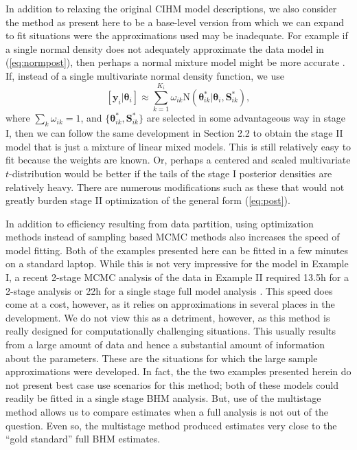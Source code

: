 \documentclass[12pt]{article}
\newcommand{\by}{\mathbf{y}}
\newcommand{\bt}{\boldsymbol{\theta}}
\newcommand{\bS}{\mathbf{S}}
\begin{document}
In addition to relaxing the original CIHM model descriptions, we also consider the method as present here to be a base-level version from which we can expand to fit situations were the approximations used may be inadequate. For example if a single normal density does not adequately approximate the data model in (\ref{eq:normpost}), then perhaps a normal mixture model might be more accurate \citep{gelman2013bayesian}. If, instead of a single multivariate normal density function, we use     
\[
[\by_i|\bt_i] \approx \sum_{k=1}^{K_i}\omega_{ik}\text{N}(\bt_{ik}^*|\bt_{i}, \bS_{ik}^*),
\]
where $\sum_k \omega_{ik} = 1$, and $\{\bt_{ik}^*, \bS_{ik}^*\}$ are selected in some advantageous way in stage I, then we can follow the same development in Section 2.2 to obtain the stage II model that is just a mixture of linear mixed models. This is still relatively easy to fit because the weights are known. Or, perhaps a centered and scaled multivariate $t$-distribution would be better if the tails of the stage I posterior densities are relatively heavy. There are numerous modifications such as these that would not greatly burden stage II optimization of the general form (\ref{eq:post}).

In addition to efficiency resulting from data partition, using optimization methods instead of sampling based MCMC methods also increases the speed of model fitting. Both of the examples presented here can be fitted in a few minutes on a standard laptop. While this is not very impressive for the model in Example I, a recent 2-stage MCMC analysis of the data in Example II required 13.5h for a 2-stage analysis or 22h for a single stage full model analysis \citep{goudie2019joining}. This speed does come at a cost, however, as it relies on approximations in several places in the development. We do not view this as a detriment, however, as this method is really designed for computationally challenging situations. This usually results from a large amount of data and hence a substantial amount of information about the parameters. These are the situations for which the large sample approximations were developed. In fact, the the two examples presented herein do not present best case use scenarios for this method; both of these models could readily be fitted in a single stage BHM analysis. But, use of the multistage method allows us to compare estimates when a full analysis is not out of the question. Even so, the multistage method produced estimates very close to the ``gold standard'' full BHM estimates.
\end{document}
